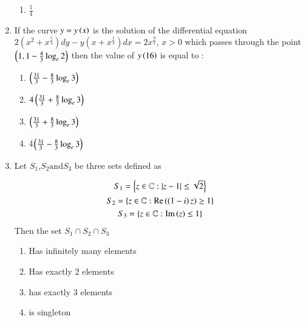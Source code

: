 \documentclass[journal,12pt,onecolumn]{IEEEtran}
\theoremstyle{remark}
\begin{document}
\begin{enumerate}
\begin{multicols}{2}
\begin{enumerate}
       \item $\frac{1}{4}$
   \end{enumerate}
   \end{multicols}
   \item If the curve $y = y\left(x\right)$ is the solution of the differential equation 
          $ 2(x^2 + x^{\frac{5}{4}}) dy - y(x + x^{\frac{1}{4}}) dx = 2 x^{\frac{9}{4}}$, $x>0$ which passes through the point $\left(1 ,1 - \frac{4}{3} \log_e 2\right)$ then the value of $y\left(16\right)$ is equal to :
          \begin{multicols}{2}
              \begin{enumerate}
                  \item $\left(\frac{31}{3}- \frac{8}{3}\log_e 3\right)$\\
                   \item $4\left(\frac{31}{3}+\frac{8}{3}\log_e 3\right)$
                    \item $\left(\frac{31}{3}+ \frac{8}{3}\log_e 3\right)$\\
                     \item 4$\left(\frac{31}{3}- \frac{8}{3}\log_e 3\right)$
              \end{enumerate}
          \end{multicols}
          \item Let $S_1 \text{,} S_2 \text{and} S_3$ be three sets defined as
          
\begin{gather*}
	S_1 = \left\{z \in \mathbb C: \left\vert z-1\right\vert \leq \sqrt{2} \right\} \\
	S_2 = \left\{z \in \mathbb C: \mathrm{Re}\left(\left(1-i\right)z\right) \geq 1 \right\} \\
	S_3 = \left\{z \in \mathbb C: \mathrm{Im}\left( z\right) \leq 1\right\}
\end{gather*}
Then the set $S_1 \cap S_2 \cap S_3$

\begin{enumerate}
    \item Has infinitely many elements
    \item Has exactly $2$ elements
    \item has exactly $3$ elements 
    \item is singleton
\end{enumerate}
\end{enumerate}
\end{document}
